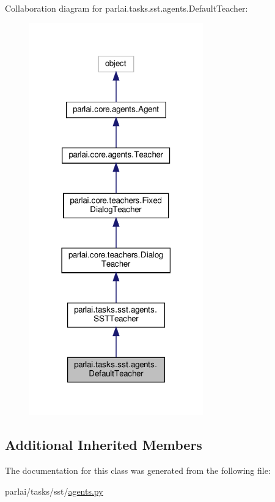 Collaboration diagram for parlai.\+tasks.\+sst.\+agents.\+Default\+Teacher\+:
\nopagebreak
\begin{figure}[H]
\begin{center}
\leavevmode
\includegraphics[width=213pt]{classparlai_1_1tasks_1_1sst_1_1agents_1_1DefaultTeacher__coll__graph}
\end{center}
\end{figure}
\subsection*{Additional Inherited Members}


The documentation for this class was generated from the following file\+:\begin{DoxyCompactItemize}
\item 
parlai/tasks/sst/\hyperlink{parlai_2tasks_2sst_2agents_8py}{agents.\+py}\end{DoxyCompactItemize}
